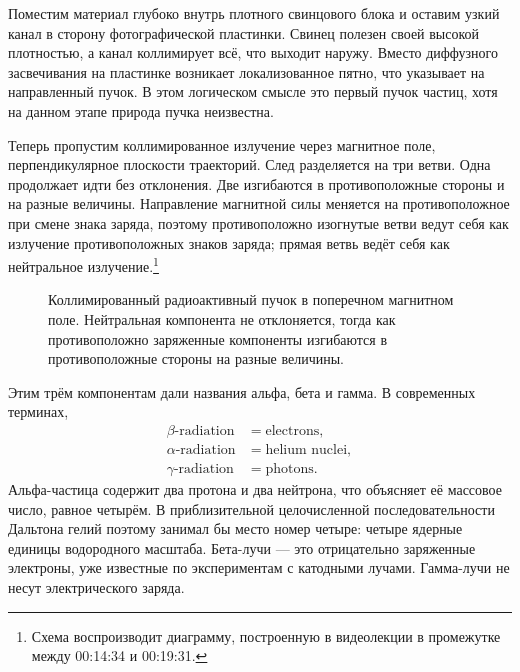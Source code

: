 Поместим материал глубоко внутрь плотного свинцового блока и оставим узкий канал в сторону фотографической пластинки. Свинец полезен своей высокой плотностью, а канал коллимирует всё, что выходит наружу. Вместо диффузного засвечивания на пластинке возникает локализованное пятно, что указывает на направленный пучок. В этом логическом смысле это первый пучок частиц, хотя на данном этапе природа пучка неизвестна.

Теперь пропустим коллимированное излучение через магнитное поле, перпендикулярное плоскости траекторий. След разделяется на три ветви. Одна продолжает идти без отклонения. Две изгибаются в противоположные стороны и на разные величины. Направление магнитной силы меняется на противоположное при смене знака заряда, поэтому противоположно изогнутые ветви ведут себя как излучение противоположных знаков заряда; прямая ветвь ведёт себя как нейтральное излучение.\footnote{Схема воспроизводит диаграмму, построенную в видеолекции в промежутке между 00:14:34 и 00:19:31.}

\begin{figure}[h]
\centering
{}
\caption{Коллимированный радиоактивный пучок в поперечном магнитном поле. Нейтральная компонента не отклоняется, тогда как противоположно заряженные компоненты изгибаются в противоположные стороны на разные величины.}
\end{figure}

Этим трём компонентам дали названия альфа, бета и гамма. В современных терминах,
\begin{equation}
\begin{aligned}
\beta\text{-radiation} &= \text{electrons},\\
\alpha\text{-radiation} &= \text{helium nuclei},\\
\gamma\text{-radiation} &= \text{photons}.
\end{aligned}
\end{equation}
Альфа-частица содержит два протона и два нейтрона, что объясняет её массовое число, равное четырём. В приблизительной целочисленной последовательности Дальтона гелий поэтому занимал бы место номер четыре: четыре ядерные единицы водородного масштаба. Бета-лучи — это отрицательно заряженные электроны, уже известные по экспериментам с катодными лучами. Гамма-лучи не несут электрического заряда.

